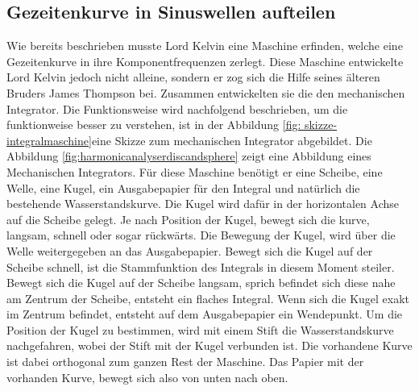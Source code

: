 \subsection{Gezeitenkurve in Sinuswellen aufteilen
	\label{gezeiten:subsection:malorum}}
Wie bereits beschrieben musste Lord Kelvin eine Maschine erfinden, welche eine Gezeitenkurve in ihre Komponentfrequenzen zerlegt.
Diese Maschine entwickelte Lord Kelvin jedoch nicht alleine, sondern er zog sich die Hilfe seines älteren Bruders James Thompson bei.
Zusammen entwickelten sie die den mechanischen Integrator.
Die Funktionsweise wird nachfolgend beschrieben, um die funktionweise besser zu verstehen, ist in der Abbildung  \ref{fig: skizze-integralmaschine}eine Skizze zum mechanischen Integrator abgebildet.
Die Abbildung \ref{fig:harmonicanalyserdiscandsphere} zeigt eine Abbildung eines Mechanischen Integrators.
Für diese Maschine benötigt er eine Scheibe, eine Welle, eine Kugel, ein Ausgabepapier für den Integral und natürlich die bestehende Wasserstandskurve.
Die Kugel wird dafür in der horizontalen Achse auf die Scheibe gelegt.
Je nach Position der Kugel, bewegt sich die kurve, langsam, schnell oder sogar rückwärts.
Die Bewegung der Kugel, wird über die Welle weitergegeben an das Ausgabepapier.
Bewegt sich die Kugel auf der Scheibe schnell, ist die Stammfunktion des Integrals in diesem Moment steiler.
Bewegt sich die Kugel auf der Scheibe langsam, sprich befindet sich diese nahe am Zentrum der Scheibe, entsteht ein flaches Integral.
Wenn sich die Kugel exakt im Zentrum befindet, entsteht auf dem Ausgabepapier ein Wendepunkt.
Um die Position der Kugel zu bestimmen, wird mit einem Stift die Wasserstandskurve nachgefahren, wobei der Stift mit der Kugel verbunden ist.
Die vorhandene Kurve ist dabei orthogonal zum ganzen Rest der Maschine.
Das Papier mit der vorhanden Kurve, bewegt sich also von unten nach oben.


